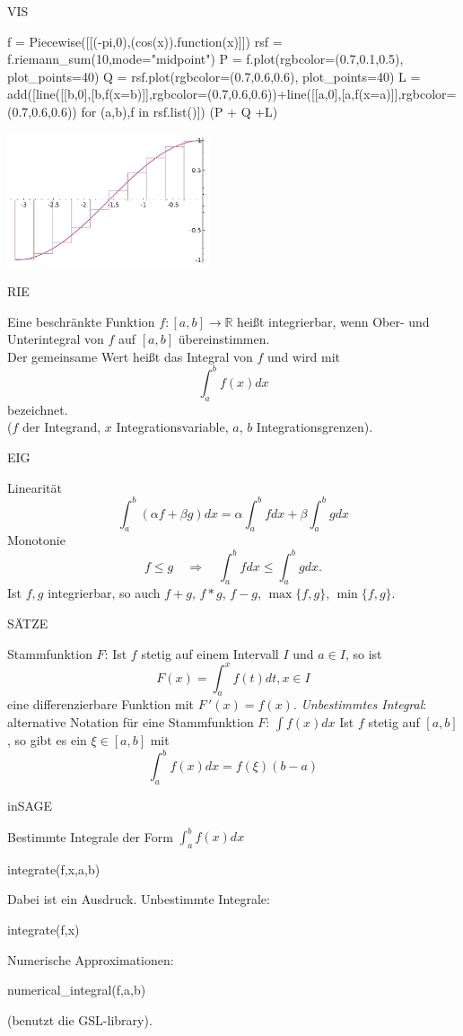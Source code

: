 \documentclass[fontsize=12pt,paper=a4,twoside,bibtotoc,idxtotoc,
liststotoc,pagesize,BCOR1.2cm,DIV15,chapterprefix,pagesize=pdftex]{scrbook}
\theoremstyle{plain}
\theoremstyle{definition}
\theoremstyle{remark}
\begin{document}
VIS

\begin{sagein}
f = Piecewise([[(-pi,0),(cos(x)).function(x)]])
rsf = f.riemann_sum(10,mode="midpoint")
P = f.plot(rgbcolor=(0.7,0.1,0.5), plot_points=40)
Q = rsf.plot(rgbcolor=(0.7,0.6,0.6), plot_points=40)
L = add([line([[b,0],[b,f(x=b)]],rgbcolor=(0.7,0.6,0.6))+line([[a,0],[a,f(x=a)]],rgbcolor=(0.7,0.6,0.6)) for (a,b),f in rsf.list()])
(P + Q +L)
\end{sagein}
\begin{center}
\includegraphics[width=6cm]{riemann.pdf}
\end{center}

RIE

Eine beschränkte Funktion $f:[a,b] \rightarrow \mathbb{R}$ heißt {\color{red}
integrierbar}, wenn Ober- und Unterintegral von $f$ auf $[a,b]$ übereinstimmen.\\
Der gemeinsame Wert heißt das {\color{red} Integral} von $f$ und wird mit 
\[ \int_a^b f(x)dx \]
bezeichnet.\\ 
($f$ der Integrand, $x$ Integrationsvariable, $a$, $b$ Integrationsgrenzen).

EIG


 Linearität
\[ \int_a^b (\alpha f + \beta g) dx = \alpha \int_a^b fdx + \beta
\int_a^b g dx \]
 Monotonie
\[  f \leq g \quad \Rightarrow \quad \int_a^b f dx \leq \int_a^b g
dx.\]
 Ist $f,g$ integrierbar, so auch $f+g$, $f*g$, $f-g$,
$\max\{f,g\}$, $\min \{f,g \}$. 


SÄTZE


 {\color{red} Stammfunktion} $F$: Ist $f$ stetig auf einem Intervall $I$ und $a \in I$, so ist 
\[F(x)= \int_a^x f(t) dt, x \in I \] eine differenzierbare Funktion mit
$F\,'(x)=f(x)$. 
 \emph{Unbestimmtes Integral}: alternative Notation für eine Stammfunktion $F$:  $\int f(x) dx$ 
 Ist $f$ stetig auf $[a,b]$, so gibt es ein $\xi \in [a,b]$ mit
\[\int_a^b f(x)dx = f(\xi) (b-a)\]


inSAGE


  Bestimmte Integrale der Form $\int_a^b f(x) dx$
\begin{sagein}
integrate(f,x,a,b) 
\end{sagein}
Dabei ist  ein Ausdruck.
 Unbestimmte Integrale:
\begin{sagein}
integrate(f,x)
\end{sagein}
 Numerische Approximationen:
\begin{sagein}
numerical_integral(f,a,b) 
\end{sagein}
(benutzt die GSL-library).
\end{document}
